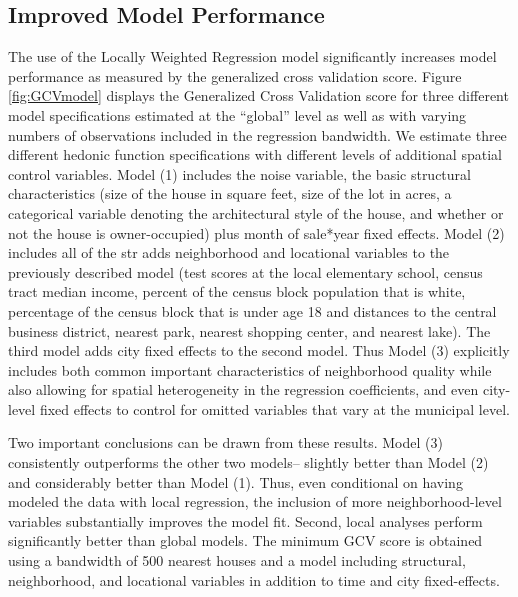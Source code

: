 \documentclass{article}\usepackage{graphicx, color}
\begin{document}
\subsection{Improved Model Performance}
The use of the Locally Weighted Regression model significantly increases model performance as measured by the generalized cross validation score. Figure \ref{fig:GCVmodel} displays the Generalized Cross Validation score for three different model specifications estimated at the ``global'' level as well as with varying numbers of observations included in the regression bandwidth. We estimate three different hedonic function specifications with different levels of additional spatial control variables. Model (1) includes the noise variable, the basic structural characteristics (size of the house in square feet, size of the lot in acres, a categorical variable denoting the architectural style of the house, and whether or not the house is owner-occupied) plus month of sale*year fixed effects. Model (2) includes all of the str adds neighborhood and locational variables to the previously described model (test scores at the local elementary school, census tract median income, percent of the census block population that is white, percentage of the census block that is under age 18 and distances to the central business district, nearest park, nearest shopping center, and nearest lake). The third model adds city fixed effects to the second model. Thus Model (3) explicitly includes both common important characteristics of neighborhood quality while also allowing for spatial heterogeneity in the regression coefficients, and even city-level fixed effects to control for omitted variables that vary at the municipal level.

Two important conclusions can be drawn from these results. Model (3) consistently outperforms the other two models-- slightly better than Model (2) and considerably better than Model (1). Thus, even conditional on having modeled the data with local regression, the inclusion of more neighborhood-level variables substantially improves the model fit. Second, local analyses perform significantly better than global models. The minimum GCV score is obtained using a bandwidth of 500 nearest houses and a model including structural, neighborhood, and locational variables in addition to time and city fixed-effects. 
\end{document}
